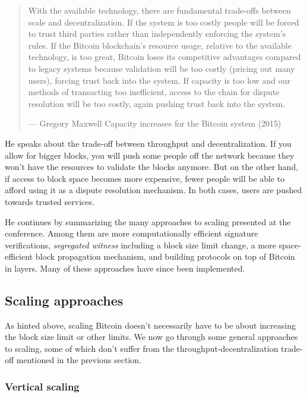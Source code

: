 \begin{quote}
With the available technology, there are fundamental trade-offs between
scale and decentralization. If the system is too costly people will be
forced to trust third parties rather than independently enforcing the
system's rules. If the Bitcoin blockchain's resource usage, relative to
the available technology, is too great, Bitcoin loses its competitive
advantages compared to legacy systems because validation will be too
costly (pricing out many users), forcing trust back into the system. If
capacity is too low and our methods of transacting too inefficient,
access to the chain for dispute resolution will be too costly, again
pushing trust back into the system.

---  Gregory Maxwell Capacity increases for the Bitcoin system (2015)
\end{quote}

He speaks about the trade-off between throughput and decentralization.
If you allow for bigger blocks, you will push some people off the
network because they won't have the resources to validate the blocks
anymore. But on the other hand, if access to block space becomes more
expensive, fewer people will be able to afford using it as a dispute
resolution mechanism. In both cases, users are pushed towards trusted
services.

He continues by summarizing the many approaches to scaling presented at
the conference. Among them are more computationally efficient signature
verifications, \emph{segregated witness} including a block size limit
change, a more space-efficient block propagation mechanism, and building
protocols on top of Bitcoin in layers. Many of these approaches have
since been implemented.

\hypertarget{_scaling_approaches}{%
\subsection{Scaling approaches}\label{_scaling_approaches}}

As hinted above, scaling Bitcoin doesn't necessarily have to be about
increasing the block size limit or other limits. We now go through some
general approaches to scaling, some of which don't suffer from the
throughput-decentralization trade-off mentioned in the previous section.

\hypertarget{verticalscaling}{%
\subsubsection{Vertical scaling}\label{verticalscaling}}

